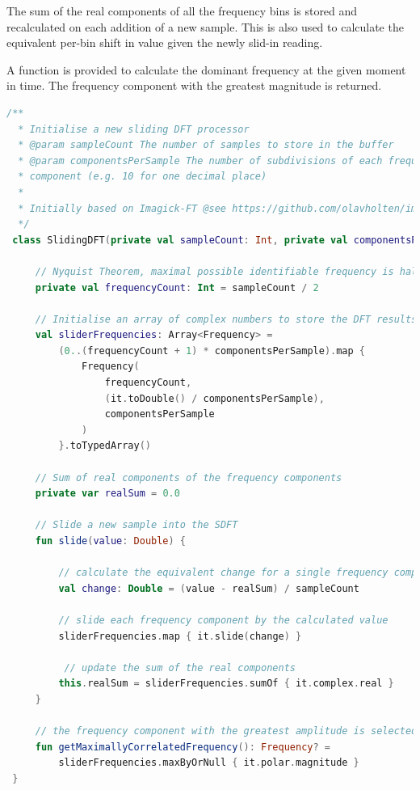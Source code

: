 \documentclass[11pt,twoside,a4paper]{report}
\begin{document}
The sum of the real components of all the frequency bins is stored and recalculated on each addition of a new sample. This is also used to calculate the equivalent per-bin shift in value given the newly slid-in reading.

A function is provided to calculate the dominant frequency at the given moment in time. The frequency component with the greatest magnitude is returned.

\begin{lstlisting}[caption={SlidingDFT.kt}, label={lst:sdft}, language=Kotlin]
  /**
  * Initialise a new sliding DFT processor
  * @param sampleCount The number of samples to store in the buffer
  * @param componentsPerSample The number of subdivisions of each frequency 
  * component (e.g. 10 for one decimal place)
  * 
  * Initially based on Imagick-FT @see https://github.com/olavholten/imagick-FT
  */
 class SlidingDFT(private val sampleCount: Int, private val componentsPerSample: Int) {
 
     // Nyquist Theorem, maximal possible identifiable frequency is half the sample frequency
     private val frequencyCount: Int = sampleCount / 2
 
     // Initialise an array of complex numbers to store the DFT results
     val sliderFrequencies: Array<Frequency> =
         (0..(frequencyCount + 1) * componentsPerSample).map {
             Frequency(
                 frequencyCount,
                 (it.toDouble() / componentsPerSample),
                 componentsPerSample
             )
         }.toTypedArray()
 
     // Sum of real components of the frequency components
     private var realSum = 0.0
 
     // Slide a new sample into the SDFT
     fun slide(value: Double) {
         
         // calculate the equivalent change for a single frequency component
         val change: Double = (value - realSum) / sampleCount
         
         // slide each frequency component by the calculated value
         sliderFrequencies.map { it.slide(change) }

          // update the sum of the real components
         this.realSum = sliderFrequencies.sumOf { it.complex.real }
     }
 
     // the frequency component with the greatest amplitude is selected
     fun getMaximallyCorrelatedFrequency(): Frequency? =
         sliderFrequencies.maxByOrNull { it.polar.magnitude } 
 }
\end{lstlisting}
\end{document}

